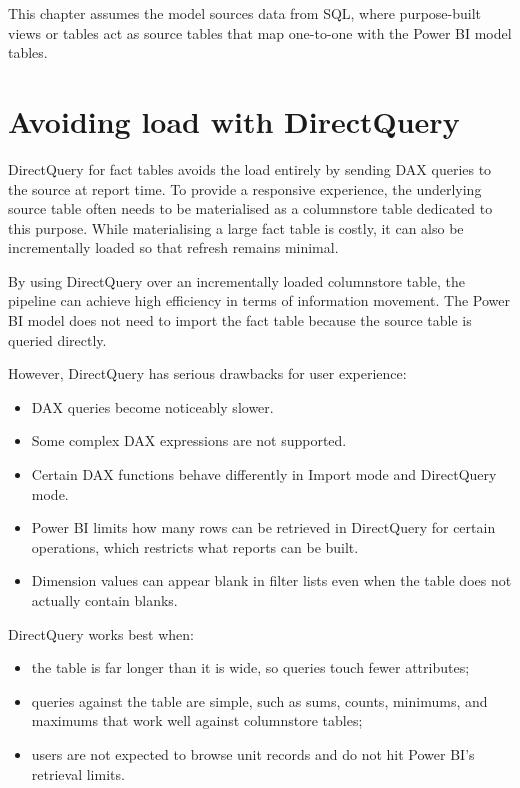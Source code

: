 \documentclass[10pt,openany,10pt]{book}
\providecommand{\tightlist}{%
  \setlength{\itemsep}{0pt}\setlength{\parskip}{0pt}}
\begin{document}
This chapter assumes the model sources data from SQL, where
purpose-built views or tables act as source tables that map one-to-one
with the Power BI model tables.

\section{Avoiding load with
DirectQuery}\label{avoiding-load-with-directquery}

DirectQuery for fact tables avoids the load entirely by sending DAX
queries to the source at report time. To provide a responsive
experience, the underlying source table often needs to be materialised
as a columnstore table dedicated to this purpose. While materialising a
large fact table is costly, it can also be incrementally loaded so that
refresh remains minimal.

By using DirectQuery over an incrementally loaded columnstore table, the
pipeline can achieve high efficiency in terms of information movement.
The Power BI model does not need to import the fact table because the
source table is queried directly.

However, DirectQuery has serious drawbacks for user experience:

\begin{itemize}
\tightlist
\item
  DAX queries become noticeably slower.
\item
  Some complex DAX expressions are not supported.
\item
  Certain DAX functions behave differently in Import mode and
  DirectQuery mode.
\item
  Power BI limits how many rows can be retrieved in DirectQuery for
  certain operations, which restricts what reports can be built.
\item
  Dimension values can appear blank in filter lists even when the table
  does not actually contain blanks.
\end{itemize}

DirectQuery works best when:

\begin{itemize}
\tightlist
\item
  the table is far longer than it is wide, so queries touch fewer
  attributes;
\item
  queries against the table are simple, such as sums, counts, minimums,
  and maximums that work well against columnstore tables;
\item
  users are not expected to browse unit records and do not hit Power
  BI's retrieval limits.
\end{itemize}
\end{document}
